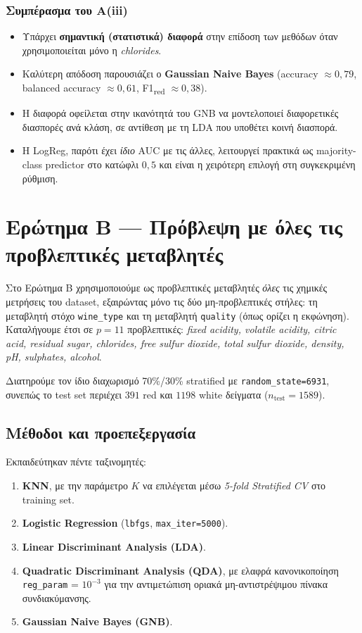 \documentclass[11pt,a4paper]{article}
\newcommand{\code}[1]{\texttt{#1}}
\begin{document}
\subsubsection*{Συμπέρασμα του Α(iii)}

\begin{itemize}[leftmargin=1.5cm]
    \item Υπάρχει \textbf{σημαντική (στατιστικά) διαφορά} στην επίδοση
    των μεθόδων όταν χρησιμοποιείται μόνο η \textit{chlorides}.
    \item Καλύτερη απόδοση παρουσιάζει ο \textbf{Gaussian Naive Bayes}
    (accuracy $\approx 0{,}79$, balanced accuracy $\approx 0{,}61$,
    F1\textsubscript{red} $\approx 0{,}38$).
    \item Η διαφορά οφείλεται στην ικανότητά του GNB να μοντελοποιεί
    διαφορετικές διασπορές ανά κλάση, σε αντίθεση με τη LDA που υποθέτει
    κοινή διασπορά.
    \item Η LogReg, παρότι έχει \emph{ίδιο} AUC με τις άλλες, λειτουργεί
    πρακτικά ως majority-class predictor στο κατώφλι $0{,}5$ και είναι
    η χειρότερη επιλογή στη συγκεκριμένη ρύθμιση.
\end{itemize}

\section{Ερώτημα Β — Πρόβλεψη με όλες τις προβλεπτικές μεταβλητές}

Στο Ερώτημα Β χρησιμοποιούμε ως προβλεπτικές μεταβλητές \emph{όλες} τις
χημικές μετρήσεις του dataset, εξαιρώντας μόνο τις δύο μη-προβλεπτικές
στήλες: τη μεταβλητή στόχο \code{wine\_type} και τη μεταβλητή \code{quality}
(όπως ορίζει η εκφώνηση). Καταλήγουμε έτσι σε $p = 11$ προβλεπτικές:
\textit{fixed acidity, volatile acidity, citric acid, residual sugar,
chlorides, free sulfur dioxide, total sulfur dioxide, density, pH,
sulphates, alcohol}.

Διατηρούμε τον ίδιο διαχωρισμό 70\%/30\% stratified με
\code{random\_state=6931}, συνεπώς το test set περιέχει
$391$ red και $1198$ white δείγματα ($n_{\text{test}} = 1589$).

\subsection{Μέθοδοι και προεπεξεργασία}

Εκπαιδεύτηκαν πέντε ταξινομητές:
\begin{enumerate}[leftmargin=1.5cm]
    \item \textbf{KNN}, με την παράμετρο $K$ να επιλέγεται μέσω
    \emph{5-fold Stratified CV} στο training set.
    \item \textbf{Logistic Regression} (\code{lbfgs}, \code{max\_iter=5000}).
    \item \textbf{Linear Discriminant Analysis (LDA)}.
    \item \textbf{Quadratic Discriminant Analysis (QDA)}, με ελαφρά
    κανονικοποίηση \code{reg\_param} = $10^{-3}$ για την αντιμετώπιση
    οριακά μη-αντιστρέψιμου πίνακα συνδιακύμανσης.
    \item \textbf{Gaussian Naive Bayes (GNB)}.
\end{enumerate}
\end{document}
